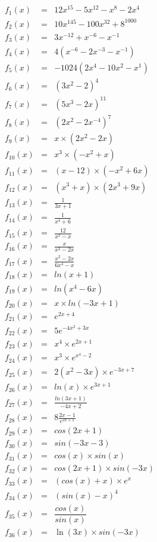 \documentclass[11pt]{article}
\begin{document}
\begin{multicols}{3}
\begin{eqnarray*}
f_{1}(x) &=& 12x^{15} - 5x^{12} - x^{8} - 2x^{4}\\
f_{2}(x) &=& 10x^{145} - 100x^{32} + 8^{1000}\\
f_{3}(x) &=& 3x^{-12} + x^{-6} - x^{-1}\\
f_{4}(x) &=& 4(x^{-6} - 2x^{-3} - x^{-1})\\
f_{5}(x) &=& -1024 (2x^{4} - 10x^{2} - x^{1})\\
f_{6}(x) &=& (3x^{2} - 2)^{4}\\
f_{7}(x) &=& (5x^{3} - 2x)^{11}\\
f_{8}(x) &=& (2x^{2} - 2x^{-4})^{7}\\
f_{9}(x) &=& x \times (2x^{2} - 2x)\\
f_{10}(x) &=& x^3 \times (-x^{2} + x) \\
f_{11}(x) &=& (x - 12) \times (-x^{2} + 6x)\\
f_{12}(x) &=& (x^3 + x) \times (2x^{3} + 9x)\\
f_{13}(x) &=& \frac{1}{3x + 1}\\
f_{14}(x) &=& \frac{1}{x^4 + 6}\\
f_{15}(x) &=& \frac{12}{x^2 - x}\\
f_{16}(x) &=& \frac{x}{x^3 - 2x}\\
f_{17}(x) &=& \frac{x^2 - 2x}{6x^4 - x}\\
f_{18}(x) &=& ln(x+1)\\
f_{19}(x) &=& ln(x^4 - 6x)\\
f_{20}(x) &=& x \times ln(-3x + 1)\\
f_{21}(x) &=& e^{2x +4}\\
f_{22}(x) &=& 5 e^{-4x^2 + 3x}\\
f_{23}(x) &=& x^4 \times e^{2x + 1}\\
f_{24}(x) &=& x^3 \times e^{x^4 - 2}\\
f_{25}(x) &=& 2 (x^2 - 3x) \times e^{-3x + 7}\\
f_{26}(x) &=& ln(x) \times e^{3x + 1}\\
f_{27}(x) &=& \frac{ln(3x+1)}{-4x+2}\\
f_{28}(x) &=& 8 \frac{2x-1}{e^{2x+1}}\\
f_{29}(x) &=& cos(2x+1)\\
f_{30}(x) &=& sin(-3x-3)\\
f_{31}(x) &=& cos(x) \times sin(x)\\
f_{32}(x) &=& cos(2x+1) \times sin(-3x)\\
f_{33}(x) &=& (cos(x) + x) \times e^{x}\\
f_{34}(x) &=& (sin(x) - x)^{4}\\
f_{35}(x) &=& \dfrac{cos(x)}{sin(x)}\\
f_{36}(x) &=& \ln(3x) \times sin(-3x)\\
\end{eqnarray*}


\end{multicols}
\end{document}
